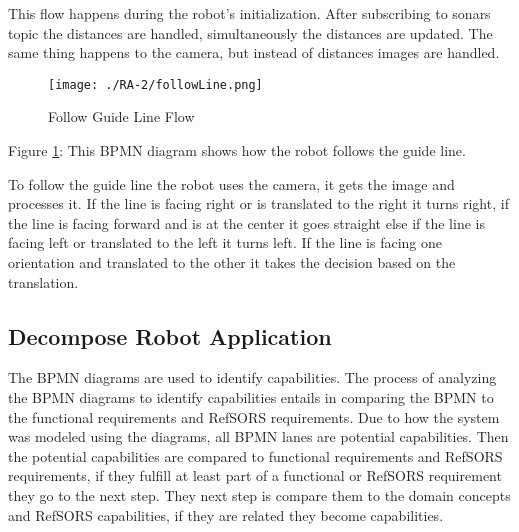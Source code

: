This flow happens during the robot's initialization. After subscribing to sonars topic the distances are handled, simultaneously the distances are updated. The same thing happens to the camera, but instead of distances images are handled.

\begin{figure}[ht!]
 \centering
 \texttt{[image: ./RA-2/followLine.png]}
 \caption{Follow Guide Line Flow}
 \label{fig:followline}
\end{figure}

Figure \ref{fig:followline}: This BPMN diagram shows how the robot follows the guide line.

To follow the guide line the robot uses the camera, it gets the image and processes it. If the line is facing right or is translated to the right it turns right, if the line is facing forward and is at the center it goes straight else if the line is facing left or translated to the left it turns left. If the line is facing one orientation and translated to the other it takes the decision based on the translation.

\subsection{Decompose Robot Application}

The BPMN diagrams are used to identify capabilities. The process of analyzing the BPMN diagrams to identify capabilities entails in comparing the BPMN to the functional requirements and RefSORS requirements. Due to how the system was modeled using the diagrams, all BPMN lanes are potential capabilities. Then the potential capabilities are compared to functional requirements and RefSORS requirements, if they fulfill at least part of a functional or RefSORS requirement they go to the next step. They next step is compare them to the domain concepts and RefSORS capabilities, if they are related they become capabilities.

